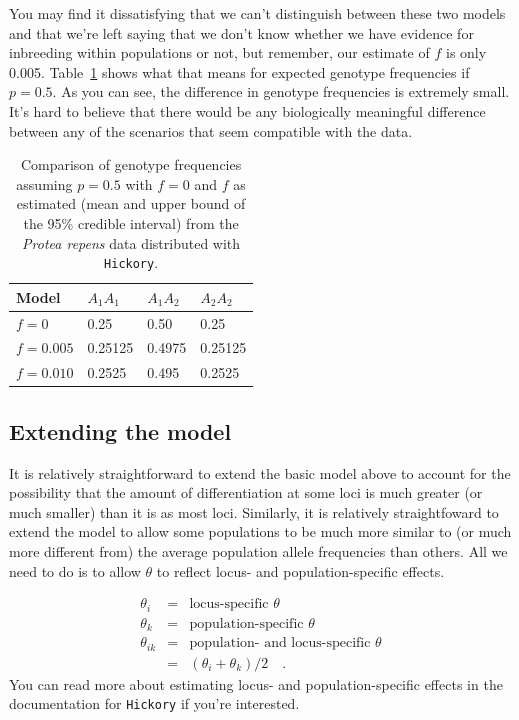 \documentclass[12pt]{article}
\begin{document}
You may find it dissatisfying that we can't distinguish between these
two models and that we're left saying that we don't know whether we
have evidence for inbreeding within populations or not, but remember,
our estimate of $f$ is only
0.005. Table~\ref{table:f-model-comparison} shows what that means for
expected genotype frequencies if $p = 0.5$. As you can see, the
difference in genotype frequencies is extremely small. It's hard to
believe that there would be any biologically meaningful difference
between any of the scenarios that seem compatible with the data.

\begin{table}
  \begin{center}
    \begin{tabular}{l|lll}
      \hline\hline
      Model       & $A_1A_1$ & $A_1A_2$ & $A_2A_2$ \\
      \hline
      $f = 0$     & 0.25     & 0.50    & 0.25 \\
      $f = 0.005$ & 0.25125  & 0.4975  & 0.25125 \\
      $f = 0.010$ & 0.2525   & 0.495   & 0.2525 \\
      \hline
    \end{tabular}
  \end{center}
  \caption{Comparison of genotype frequencies assuming $p = 0.5$ with
    $f = 0$ and $f$ as estimated (mean and upper bound of the 95\%
    credible interval) from the {\it Protea repens\/} data distributed
    with {\tt Hickory}.}\label{table:f-model-comparison}
\end{table}

\subsection*{Extending the model}

It is relatively straightforward to extend the basic model above to
account for the possibility that the amount of differentiation at some
loci is much greater (or much smaller) than it is as most
loci. Similarly, it is relatively straightfoward to extend the model
to allow some populations to be much more similar to (or much more
different from) the average population allele frequencies than
others. All we need to do is to allow $\theta$ to reflect locus- and
population-specific effects.

\begin{eqnarray*}
  \theta_i &=& \mbox{locus-specific $\theta$} \\
  \theta_k &=& \mbox{population-specific $\theta$} \\
  \theta_{ik} &=& \mbox{population- and locus-specific $\theta$} \\
  &=& (\theta_i + \theta_k)/2 \quad .
\end{eqnarray*}
You can read more about estimating locus- and population-specific
effects in the documentation for {\tt Hickory} if you're interested.




\ccLicense
\end{document}
